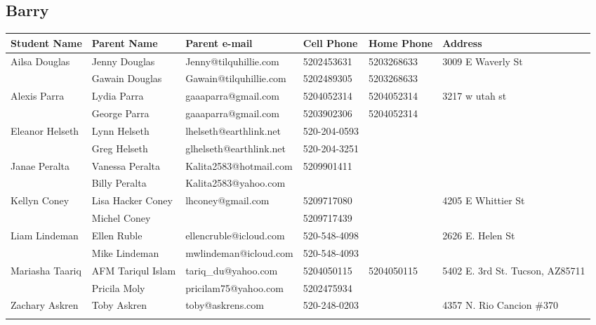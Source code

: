 \documentclass[landscape]{article}\usepackage[]{graphicx}\usepackage[]{color}
\begin{document}
\subsection{Barry}
\begin{longtable}{|p{100pt}|p{100pt}|p{140pt}|p{60pt}|p{64pt}|p{120pt}|}
\textbf{Student Name} & \textbf{Parent Name} & \textbf{Parent e-mail} & \textbf{Cell Phone} & \textbf{Home Phone} & \textbf{Address}\\
\hline
\hline
\multirow{2}{100pt}{Ailsa Douglas} & Jenny Douglas & Jenny@tilquhillie.com & 5202453631 & 5203268633 & \multirow{2}{120pt}{3009 E Waverly St} \\
 & Gawain Douglas & Gawain@tilquhillie.com & 5202489305 & 5203268633 & \\
\hline
\multirow{2}{100pt}{Alexis Parra} & Lydia Parra & gaaaparra@gmail.com & 5204052314 & 5204052314 & \multirow{2}{120pt}{3217 w utah st} \\
 & George Parra & gaaaparra@gmail.com & 5203902306 & 5204052314 & \\
\hline
\multirow{2}{100pt}{Eleanor Helseth} & Lynn Helseth & lhelseth@earthlink.net & 520-204-0593 &  & \multirow{2}{120pt}{} \\
 & Greg Helseth & glhelseth@earthlink.net & 520-204-3251 &  & \\
\hline
\multirow{2}{100pt}{Janae Peralta} & Vanessa Peralta  & Kalita2583@hotmail.com & 5209901411 &  & \multirow{2}{120pt}{} \\
 & Billy Peralta & Kalita2583@yahoo.com &  &  & \\
\hline
\multirow{2}{100pt}{Kellyn Coney} & Lisa Hacker Coney & lhconey@gmail.com & 5209717080 &  & \multirow{2}{120pt}{4205 E Whittier St} \\
 & Michel Coney &  & 5209717439 &  & \\
\hline
\multirow{2}{100pt}{Liam Lindeman} & Ellen Ruble & ellencruble@icloud.com & 520-548-4098 &  & \multirow{2}{120pt}{2626 E. Helen St} \\
 & Mike Lindeman & mwlindeman@icloud.com & 520-548-4093 &  & \\
\hline
\multirow{2}{100pt}{Mariasha Taariq} & AFM Tariqul Islam & tariq\_du@yahoo.com & 5204050115 & 5204050115 & \multirow{2}{120pt}{5402 E. 3rd St. Tucson, AZ85711} \\
 & Pricila Moly & pricilam75@yahoo.com & 5202475934 &  & \\
\hline
\multirow{2}{100pt}{Zachary Askren} & Toby Askren & toby@askrens.com & 520-248-0203 &  & \multirow{2}{120pt}{4357 N. Rio Cancion \#370} \\
 &  &  &  &  & \\
\hline
\end{longtable}
\newpage
\end{document}
